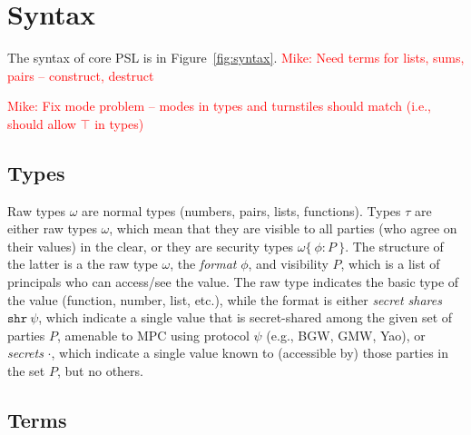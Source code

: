 \documentclass[10pt]{article}
\newcommand{\ssec}{\ensuremath{\mathtt{\cdot}}}
\newcommand{\isec}{\ensuremath{\mathtt{pmap}}}
\newcommand{\sshare}[1]{\ensuremath{\mathtt{shr}~{#1}}}
\newcommand{\sectyp}[3]{\ensuremath{{#1} \{~{#2}:{#3}~\}}}
\newcommand{\mwh}[1]{\textcolor{red}{Mike: #1}}
\begin{document}
\section{Syntax}
  
The syntax of core PSL is in Figure~\ref{fig:syntax}. \mwh{Need terms for
  lists, sums, pairs -- construct, destruct}

\mwh{Fix mode problem -- modes in types and turnstiles should match
  (i.e., should allow $\top$ in types)}

\subsection{Types}

Raw types $\omega$ are normal types (numbers, pairs, lists,
functions). Types $\tau$ are either raw types $\omega$, which mean
that they are visible to all parties (who agree on their values) in
the clear, or they are security types $\sectyp{\omega}{\phi}{P}$. The
structure of the latter is a the raw type $\omega$, the \emph{format}
$\phi$, and visibility $P$, which is a list of principals who can
access/see the value.  The raw type indicates the basic type of the
value (function, number, list, etc.), while the format is either
\emph{secret shares} $\sshare\psi$, which indicate a single 
  value that is secret-shared among the given set of parties $P$,
  amenable to MPC using protocol $\psi$ (e.g., BGW, GMW, Yao), or 
\emph{secrets} \ssec, which indicate a single value known to
  (accessible by) those parties in the set $P$, but no others.

\subsection{Terms}


\end{document}
